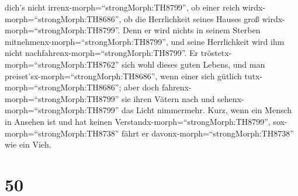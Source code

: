 dich's nicht irrenx-morph=``strongMorph:TH8799'', ob einer reich
wirdx-morph=``strongMorph:TH8686'', ob die Herrlichkeit seines Hauses
groß wirdx-morph=``strongMorph:TH8799''.  Denn er wird
nichts in seinem Sterben mitnehmenx-morph=``strongMorph:TH8799'', und
seine Herrlichkeit wird ihm nicht
nachfahrenx-morph=``strongMorph:TH8799''.  Er
tröstetx-morph=``strongMorph:TH8762'' sich wohl dieses guten Lebens, und
man preiset'sx-morph=``strongMorph:TH8686'', wenn einer sich gütlich
tutx-morph=``strongMorph:TH8686'';  aber doch
fahrenx-morph=``strongMorph:TH8799'' sie ihren Vätern nach und
sehenx-morph=``strongMorph:TH8799'' das Licht nimmermehr. 
Kurz, wenn ein Mensch in Ansehen ist und hat keinen
Verstandx-morph=``strongMorph:TH8799'', sox-morph=``strongMorph:TH8738''
fährt er davonx-morph=``strongMorph:TH8738'' wie ein Vieh.

\hypertarget{section-49}{%
\section{50}\label{section-49}}

